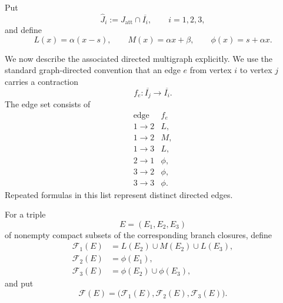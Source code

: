 \documentclass[11pt]{amsart}
\theoremstyle{plain}
\theoremstyle{definition}
\theoremstyle{remark}
\begin{document}
Put
\[
        \widehat J_i:=J_{\mathrm{att}}\cap\overline{I_i},
        \qquad i=1,2,3,
\]
and define
\[
        L(x)=\alpha(x-s),
        \qquad
        M(x)=\alpha x+\beta,
        \qquad
        \phi(x)=s+\alpha x.
\]

We now describe the associated directed multigraph explicitly. We use the
standard graph-directed convention that an edge \(e\) from vertex \(i\) to
vertex \(j\) carries a contraction
\[
        f_e:\overline{I_j}\longrightarrow\overline{I_i}.
\]
The edge set consists of
\[
\begin{array}{c|c}
\text{edge}&f_e\\
\hline
1\to2&L,\\
1\to2&M,\\
1\to3&L,\\
2\to1&\phi,\\
3\to2&\phi,\\
3\to3&\phi.
\end{array}
\]
Repeated formulas in this list represent distinct directed edges.

For a triple
\[
        E=(E_1,E_2,E_3)
\]
of nonempty compact subsets of the corresponding branch closures, define
\[
\begin{aligned}
        \mathcal F_1(E)
        &=
        L(E_2)\cup M(E_2)\cup L(E_3),\\
        \mathcal F_2(E)
        &=
        \phi(E_1),\\
        \mathcal F_3(E)
        &=
        \phi(E_2)\cup\phi(E_3),
\end{aligned}
\]
and put
\[
        \mathcal F(E)
        =
        \bigl(
        \mathcal F_1(E),
        \mathcal F_2(E),
        \mathcal F_3(E)
        \bigr).
\]
\end{document}

